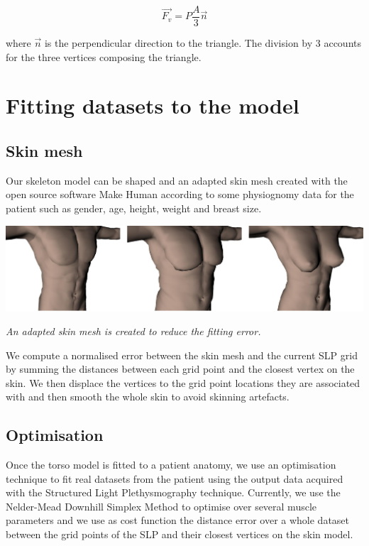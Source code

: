 \documentclass[boxedsections ,landscape, a0]{sciposter_v2}
\begin{document}
\begin{multicols}{4}
\begin{equation}\vec{F_{v}} = P\frac{A}{3}\vec{n} \end{equation}

where $\vec{n}$ is the perpendicular direction to the triangle. The division by 3 accounts for the three vertices composing the triangle.


	
\section{Fitting datasets to the model}	

\subsection{Skin mesh}
Our skeleton model can be shaped and an adapted skin mesh created with the open source software Make Human \cite{makehuman2010} according to some physiognomy data for the patient such as gender, age, height, weight and  breast size.

  \begin{center}
    \includegraphics[width=0.85\columnwidth]{imgs/skins}
    
    
     \emph{An adapted skin mesh is created to reduce the fitting error.}     
  \end{center}


We compute a normalised error between the skin mesh and the current SLP grid by summing the distances between each grid point and the closest vertex on the skin. We then displace the vertices to the grid point locations they are associated with and then smooth the whole skin to avoid skinning artefacts.

\subsection{Optimisation}

Once the torso model is fitted to a patient anatomy, we use an optimisation technique to fit real datasets from the patient using the output data acquired with the Structured Light Plethysmography technique. 
Currently, we use the Nelder-Mead Downhill
Simplex Method to optimise over several muscle parameters and
we use as cost function the distance error over a whole dataset between
the grid points of the SLP and their closest vertices on the
skin model. 


\end{multicols}
\end{document}

